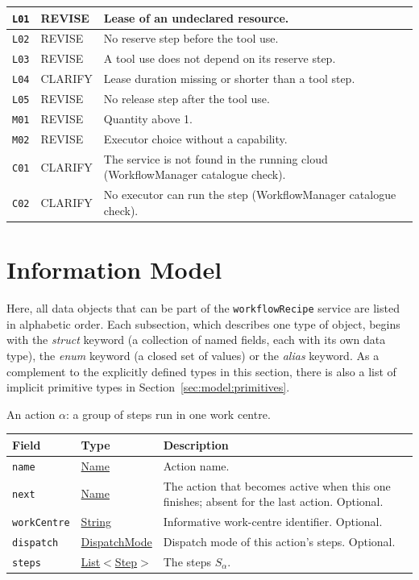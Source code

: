 \documentclass[a4paper]{arrowhead}
\newcommand{\mref}[1]{{\textcolor{ArrowheadPurple}{\hyperref[sec:model:#1]{#1}}}}
\newcommand{\pref}[1]{{\textcolor{ArrowheadGrey}{\hyperref[sec:model:primitives:#1]{#1}}}}
\begin{document}
{\begin{longtable}{|p{1.3cm}|p{1.9cm}|p{12.8cm}|}
\texttt{L01} & REVISE & Lease of an undeclared resource. \\ \hline
\texttt{L02} & REVISE & No reserve step before the tool use. \\ \hline
\texttt{L03} & REVISE & A tool use does not depend on its reserve step. \\ \hline
\texttt{L04} & CLARIFY & Lease duration missing or shorter than a tool step. \\ \hline
\texttt{L05} & REVISE & No release step after the tool use. \\ \hline
\texttt{M01} & REVISE & Quantity above 1. \\ \hline
\texttt{M02} & REVISE & Executor choice without a capability. \\ \hline
\texttt{C01} & CLARIFY & The service is not found in the running cloud (WorkflowManager catalogue check). \\ \hline
\texttt{C02} & CLARIFY & No executor can run the step (WorkflowManager catalogue check). \\ \hline
\end{longtable}
}


\newpage
\section{Information Model}
\label{sec:model}
Here, all data objects that can be part of the \texttt{workflowRecipe} service are listed in alphabetic order. Each
subsection, which describes one type of object, begins with the \textit{struct} keyword (a collection of named fields,
each with its own data type), the \textit{enum} keyword (a closed set of values) or the \textit{alias} keyword. As a
complement to the explicitly defined types in this section, there is also a list of implicit primitive types in
Section~\ref{sec:model:primitives}.

An action $\alpha$: a group of steps run in one work centre.

{\small
\begin{longtable}{|p{3.9cm}|p{4.4cm}|p{7.5cm}|}

\hline
\rowcolor{gray!33} Field & Type & Description \\ \hline
\endhead
\texttt{name} & \pref{Name} & Action name. \\ \hline
\texttt{next} & \pref{Name} & The action that becomes active when this one finishes; absent for the last action. Optional. \\ \hline
\texttt{workCentre} & \pref{String} & Informative work-centre identifier. Optional. \\ \hline
\texttt{dispatch} & \mref{DispatchMode} & Dispatch mode of this action's steps. Optional. \\ \hline
\texttt{steps} & \pref{List}$<$\mref{Step}$>$ & The steps $S_\alpha$. \\ \hline
\end{longtable}
}
\end{document}
